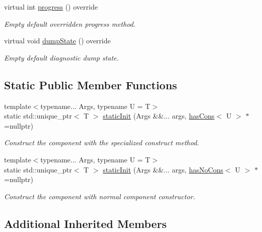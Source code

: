 \begin{DoxyCompactItemize}
virtual int \hyperlink{structvt_1_1runtime_1_1component_1_1_component_a1dab11d9eb5bed8dfd5a3bb8fdf67f5a}{progress} () override
\begin{DoxyCompactList}\small\item\em Empty default overridden progress method. \end{DoxyCompactList}\item 
virtual void \hyperlink{structvt_1_1runtime_1_1component_1_1_component_adaf8bd995d4c91702e2ff7806ad9e695}{dump\+State} () override
\begin{DoxyCompactList}\small\item\em Empty default diagnostic dump state. \end{DoxyCompactList}\end{DoxyCompactItemize}
\subsection*{Static Public Member Functions}
\begin{DoxyCompactItemize}
\item 
{\footnotesize template$<$typename... Args, typename U  = T$>$ }\\static std\+::unique\+\_\+ptr$<$ T $>$ \hyperlink{structvt_1_1runtime_1_1component_1_1_component_a7d82b061566ef21d6438f4701ae6b733}{static\+Init} (Args \&\&... args, \hyperlink{structvt_1_1runtime_1_1component_1_1_component_aca5f3a7c1db697b6d0ba70de7ff8b887}{has\+Cons}$<$ U $>$ $\ast$=nullptr)
\begin{DoxyCompactList}\small\item\em Construct the component with the specialized construct method. \end{DoxyCompactList}\item 
{\footnotesize template$<$typename... Args, typename U  = T$>$ }\\static std\+::unique\+\_\+ptr$<$ T $>$ \hyperlink{structvt_1_1runtime_1_1component_1_1_component_aaada4d04e8adf4cc5556bed2fdcdb321}{static\+Init} (Args \&\&... args, \hyperlink{structvt_1_1runtime_1_1component_1_1_component_a389e53dbfc20013d66ef09d4f42c0a53}{has\+No\+Cons}$<$ U $>$ $\ast$=nullptr)
\begin{DoxyCompactList}\small\item\em Construct the component with normal component constructor. \end{DoxyCompactList}\end{DoxyCompactItemize}
\subsection*{Additional Inherited Members}


